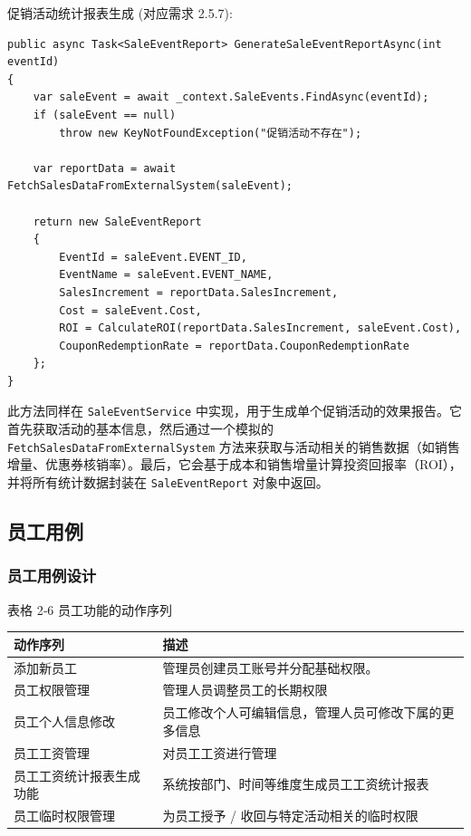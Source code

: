 \documentclass[]{article}
\begin{document}
促销活动统计报表生成 (对应需求 2.5.7):
\begin{verbatim}
public async Task<SaleEventReport> GenerateSaleEventReportAsync(int eventId)
{
    var saleEvent = await _context.SaleEvents.FindAsync(eventId);
    if (saleEvent == null)
        throw new KeyNotFoundException("促销活动不存在");
    
    var reportData = await FetchSalesDataFromExternalSystem(saleEvent);

    return new SaleEventReport
    {
        EventId = saleEvent.EVENT_ID,
        EventName = saleEvent.EVENT_NAME,
        SalesIncrement = reportData.SalesIncrement,
        Cost = saleEvent.Cost,
        ROI = CalculateROI(reportData.SalesIncrement, saleEvent.Cost),
        CouponRedemptionRate = reportData.CouponRedemptionRate
    };
}
\end{verbatim}
此方法同样在 \texttt{SaleEventService} 中实现，用于生成单个促销活动的效果报告。它首先获取活动的基本信息，然后通过一个模拟的 \texttt{FetchSalesDataFromExternalSystem} 方法来获取与活动相关的销售数据（如销售增量、优惠券核销率）。最后，它会基于成本和销售增量计算投资回报率（ROI），并将所有统计数据封装在 \texttt{SaleEventReport} 对象中返回。


\hypertarget{ux5458ux5de5ux7528ux4f8b}{%
  \subsection{员工用例}\label{ux5458ux5de5ux7528ux4f8b}}

\hypertarget{ux5458ux5de5ux7528ux4f8bux8bbeux8ba1}{%
  \subsubsection{员工用例设计}\label{ux5458ux5de5ux7528ux4f8bux8bbeux8ba1}}

表格 2‑6 员工功能的动作序列

\begin{longtable}[]{@{}ll@{}}
  \toprule
  动作序列         & 描述\tabularnewline
  \midrule
  \endhead
  添加新员工        & 管理员创建员工账号并分配基础权限。\tabularnewline
  员工权限管理       & 管理人员调整员工的长期权限\tabularnewline
  员工个人信息修改     &
  员工修改个人可编辑信息，管理人员可修改下属的更多信息\tabularnewline
  员工工资管理       & 对员工工资进行管理\tabularnewline
  员工工资统计报表生成功能 &
  系统按部门、时间等维度生成员工工资统计报表\tabularnewline
  员工临时权限管理     & 为员工授予 /
  收回与特定活动相关的临时权限\tabularnewline
  \bottomrule
\end{longtable}
\end{document}
